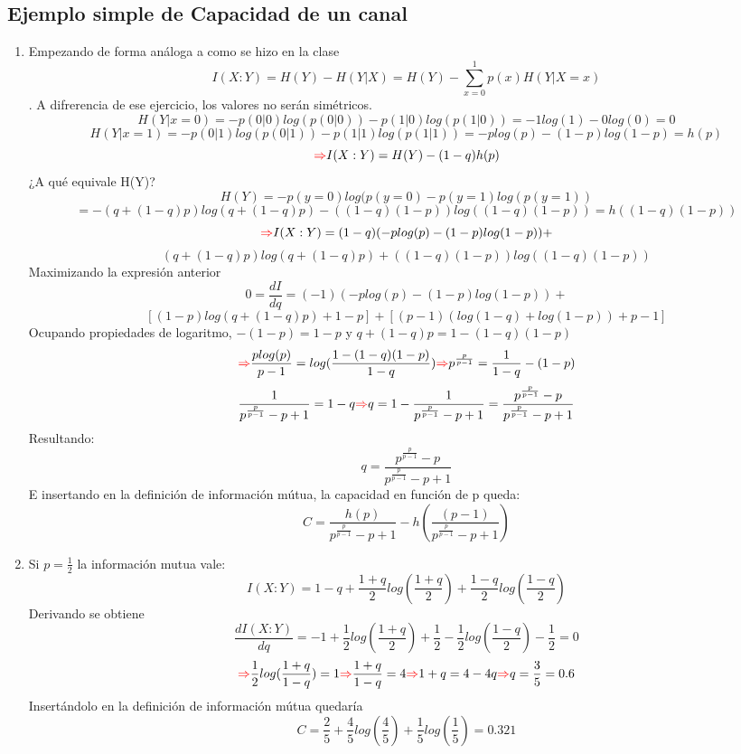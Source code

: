 \documentclass{book}
\begin{document}
\subsection{Ejemplo simple de Capacidad de un canal}\begin{enumerate}
\item Empezando de forma análoga a como se hizo en la clase
$$ I(X:Y)=H(Y)-H(Y|X)=H(Y)-\sum_{x=0}^1 p(x)H(Y|X=x)$$. A difrerencia de ese ejercicio, los valores no serán simétricos.
$$ H(Y|x=0)= -p(0|0)log(p(0|0))-p(1|0)log(p(1|0))=-1log(1)-0log(0)=0$$
$$ H(Y|x=1)= -p(0|1)log(p(0|1))-p(1|1)log(p(1|1))=-plog(p)-(1-p)log(1-p)=h(p)$$
$$ \textcolor{red}{\Rightarrow} I(X:Y)=H(Y)-(1-q)h(p)$$
¿A qué equivale H(Y)?
$$ H(Y)=-p(y=0)log(p(y=0)-p(y=1)log(p(y=1)) $$ $$=-(q+(1-q)p)log(q+(1-q)p)-((1-q)(1-p))log((1-q)(1-p))=h((1-q)(1-p))$$
$$\textcolor{red}{\Rightarrow} I(X:Y)=(1-q)(-plog(p)-(1-p)log(1-p))+$$ $$ (q+(1-q)p)log(q+(1-q)p)+((1-q)(1-p))log((1-q)(1-p))$$
Maximizando la expresión anterior
$$ 0=\frac{d I}{dq}=(-1)(-plog(p)-(1-p)log(1-p))+ $$ $$[(1-p)log(q+(1-q)p)+1-p]+[(p-1)(log(1-q)+log(1-p))+p-1]$$
Ocupando propiedades de logaritmo, $-(1-p)=1-p$ y $q+(1-q)p=1-(1-q)(1-p)$
$$ \textcolor{red}{\Rightarrow} \frac{plog(p)}{p-1}=log(\frac{1-(1-q)(1-p)}{1-q}) \textcolor{red}{\Rightarrow} p^{\frac{p}{p-1}}=\frac{1}{1-q}-(1-p)$$
$$\frac{1}{p^{\frac{p}{p-1}}-p+1}=1-q \textcolor{red}{\Rightarrow} q= 1-\frac{1}{p^{\frac{p}{p-1}}-p+1}=\frac{p^{\frac{p}{p-1}}-p}{p^{\frac{p}{p-1}}-p+1}$$
Resultando: $$q=\frac{p^{\frac{p}{p-1}}-p}{p^{\frac{p}{p-1}}-p+1} $$
E insertando en la definición de información mútua, la capacidad en función de p queda:
$$C=\frac{h(p)}{p^{\frac{p}{p-1}}-p+1}-h(\frac{(p-1)}{p^{\frac{p}{p-1}}-p+1})$$


\item Si $p=\frac{1}{2}$ la información mutua vale:
$$ I(X:Y)=1-q+\frac{1+q}{2}log(\frac{1+q}{2})+\frac{1-q}{2}log(\frac{1-q}{2})$$
Derivando se obtiene
$$ \frac{d I(X:Y)}{dq}=-1+\frac{1}{2}log(\frac{1+q}{2})+\frac{1}{2}-\frac{1}{2}log(\frac{1-q}{2})-\frac{1}{2}=0 $$
$$\textcolor{red}{\Rightarrow} \frac{1}{2}log(\frac{1+q}{1-q})=1 \textcolor{red}{\Rightarrow} \frac{1+q}{1-q}=4 \textcolor{red}{\Rightarrow} 1+q=4-4q\textcolor{red}{\Rightarrow} q=\frac{3}{5}=0.6$$
Insertándolo en la definición de información mútua quedaría
$$ C=\frac{2}{5}+\frac{4}{5}log(\frac{4}{5})+\frac{1}{5}log(\frac{1}{5})=0.321$$

\end{enumerate}
\end{document}
